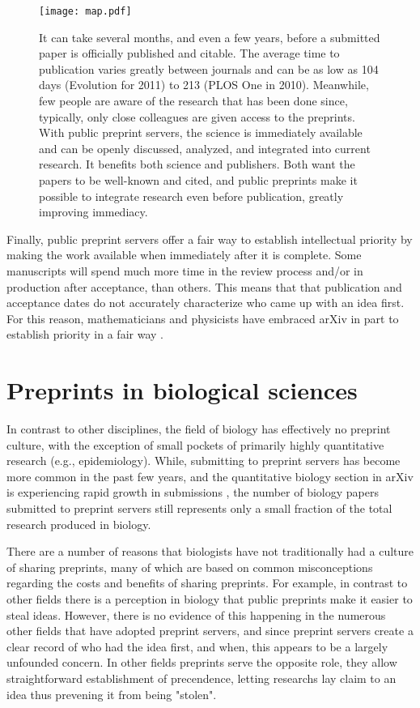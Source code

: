 \documentclass[letterpaper,twocolumn,superscriptaddress,showkeys,longbibliography]{revtex4-1}
\begin{document}
\begin{figure}[ht!] \centering\texttt{[image: map.pdf]}
\caption { It can take several months, and even a few years, before a submitted
paper is officially published and citable.  The average time to publication
varies greatly between journals and can be as low as 104 days (Evolution for
2011) to 213 (PLOS One in 2010).  Meanwhile, few people are aware of the
research that has been done since, typically, only close colleagues are given
access to the preprints. With public preprint servers, the science is
immediately available and can be openly discussed, analyzed, and integrated into
current research. It benefits both science and publishers. Both want the papers
to be well-known and cited, and public preprints make it possible to integrate
research even before publication, greatly improving immediacy.  }
\label{fig:map} \end{figure}

Finally, public preprint servers offer a fair way to establish intellectual
priority by making the work available when immediately after it is complete.
Some manuscripts will spend much more time in the review process and/or in
production after acceptance, than others. This means that
that publication and acceptance dates do not accurately characterize who
came up with an idea first. For this reason, mathematicians and physicists
have embraced arXiv in part to establish priority in a fair way \cite{gin11,cal12}.

\section{Preprints in biological sciences}

In contrast to other disciplines, the field of biology has effectively no preprint
culture, with the exception of small pockets of primarily highly quantitative
research (e.g., epidemiology). While, submitting to preprint servers has become
more common in the past few years, and the quantitative biology section in arXiv
is experiencing rapid growth in submissions \cite{cal12}, the number of biology
papers submitted to preprint servers still represents only a small fraction of
the total research produced in biology.

There are a number of reasons that biologists have not traditionally had a
culture of sharing preprints, many of which are based on common misconceptions
regarding the costs and benefits of sharing preprints. For example, in contrast
to other fields there is a perception in biology that public preprints
make it easier to steal ideas. However, there is no evidence of this happening
in the numerous other fields that have adopted preprint servers, and since preprint
servers create a clear record of who had the idea first, and when, this
appears to be a largely unfounded concern. In other fields preprints serve the
opposite role, they allow straightforward establishment of precendence, letting
researchs lay claim to an idea thus prevening it from being "stolen".
\end{document}

